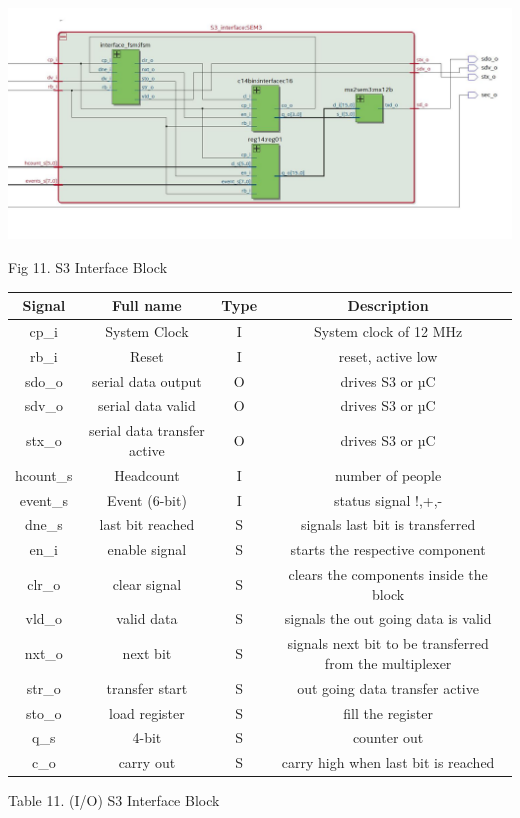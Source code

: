 \documentclass{article}
\begin{document}
\begin{center}

\includegraphics[width=15cm]{s3.JPG}
\end{center}
Fig 11. S3 Interface Block
 \begin{center}
           \begin{tabular}{|c|c|c|c|}
        \hline 
        Signal  &  Full name & Type & Description \\
        \hline
        \hline
        cp\_i & System Clock & I &   System clock of 12 MHz \\ 
        \hline
        rb\_i &   Reset &  I &reset, active low \\
        \hline 
        sdo\_o &   serial data output & O & drives S3 or µC\\
        \hline 
        sdv\_o &   serial data valid &  O &  drives S3 or µC\\
        \hline
        stx\_o &     serial data transfer active & O &   drives S3 or µC \\
        \hline
          hcount\_s     & Headcount & I &  number of people  \\
        \hline
        event\_s &   Event (6-bit) & I & status signal !,+,- \\
        \hline 
        dne\_s   & last bit reached & S & signals last bit is transferred\\
        \hline
        en\_i  & enable signal & S & starts the  respective component \\
        \hline
        clr\_o & clear signal & S & clears the components inside the block \\
        \hline
        vld\_o & valid data & S & signals the out going data is valid \\
        \hline
        nxt\_o & next bit & S &  signals next bit to be transferred from the multiplexer \\
        \hline
        str\_o & transfer start & S&  out going data transfer active \\
        \hline
        sto\_o & load register & S & fill the register \\
        \hline
        q\_s & 4-bit & S & counter out \\
        \hline
        c\_o & carry out &  S & carry high when last bit is reached \\
        \hline
          \end{tabular}
\end{center}
Table 11. (I/O) S3 Interface Block 
\vspace{1 cm}
\end{document}
